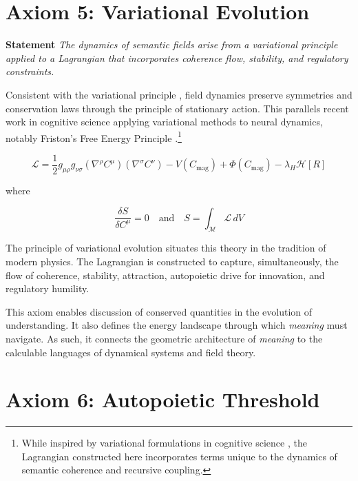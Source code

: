 \section{Axiom 5: Variational Evolution}
\label{1.5:axiom_5_variational_evolution}

\textbf{Statement} \textit{The dynamics of semantic fields arise from a variational principle applied to a Lagrangian that incorporates coherence flow, stability, and regulatory constraints.}

Consistent with the variational principle \autocite{GoldsteinPooleSafko2002, Arnold1989}, field dynamics preserve symmetries and conservation laws through the principle of stationary action. This parallels recent work in cognitive science applying variational methods to neural dynamics, notably Friston's Free Energy Principle \autocite{Friston2010, Parr2022}.\footnote{While inspired by variational formulations in cognitive science \autocite{Friston2010, Parr2022}, the Lagrangian constructed here incorporates terms unique to the dynamics of semantic coherence and recursive coupling.}

\begin{equation}
\mathcal{L} = \frac{1}{2} g_{\mu\rho} g_{\nu\sigma} (\nabla^\rho C^\mu)(\nabla^\sigma C^\nu) - V(C_{\text{mag}}) + \Phi(C_{\text{mag}}) - \lambda_H \mathcal{H}[R]
\end{equation}

where

\begin{equation}
\frac{\delta S}{\delta C^\mu} = 0 \quad \text{and} \quad S = \int_{\mathcal{M}} \mathcal{L} \, dV
\end{equation}

The principle of variational evolution situates this theory in the tradition of modern physics. The Lagrangian is constructed to capture, simultaneously, the flow of coherence, stability, attraction, autopoietic drive for innovation, and regulatory humility.

This axiom enables discussion of conserved quantities in the evolution of understanding. It also defines the energy landscape through which \textit{meaning} must navigate. As such, it connects the geometric architecture of \textit{meaning} to the calculable languages of dynamical systems and field theory.


\section{Axiom 6: Autopoietic Threshold}
\label{1.6:axiom_6_autopoietic_threshold}

